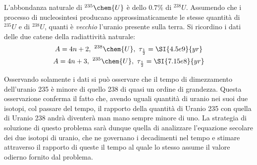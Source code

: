 \documentclass[../main.tex]{subfile}
\begin{document}
	\begin{ese}[3.2]\label{ese:UDecay}
		L'abbondanza naturale di $ ^{235}\chem{U} $ è dello $ 0.7\% $ di $ ^{238}U $. Assumendo che i processo di nucleosintesi producano approssimaticamente le stesse quantità di $ ^{235}U $ e di $ ^{238}U $, quanti è \emph{vecchio} l'uranio presente sulla terra. Si ricordino i dati delle due catene della radiattività naturale:
		\begin{gather}
		A=4n+2,\ ^{238}\chem{U},\ \tau_{\frac{1}{2}}=\SI{4.5e9}{yr} \\
		A=4n+3,\ ^{235}\chem{U},\ \tau_{\frac{1}{2}}=\SI{7.15e8}{yr}
		\end{gather}
	\end{ese}
	\begin{svol}
		Osservando solamente i dati si può osservare che il tempo di dimezzamento dell'uranio 235 è minore di quello 238 di quasi un ordine di grandezza. Questa osservazione conferma il fatto che, avendo uguali quantità di uranio nei suoi due isotopi, col passare del tempo, il rapporto della quantità di Uranio 235 con quella di Uranio 238 andrà diventerà man mano sempre minore di uno. La strategia di soluzione di questo problema sarà dunque quella di analizzare l'equazione secolare dei due isotopi di uranio, che ne governano i decadimenti nel tempo e stimare attraverso il rapporto di queste il tempo al quale lo stesso assume il valore odierno fornito dal problema. 
		

\end{svol}
\end{document}

